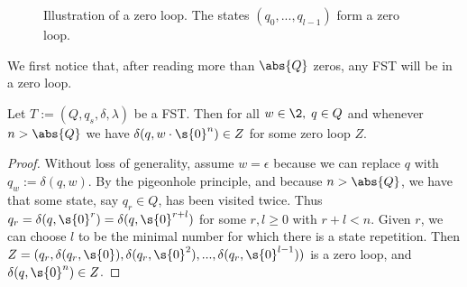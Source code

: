 \begin{figure}[H]
	\centering
	\caption{Illustration of a zero loop. The states $(q_0,...,q_{l-1})$ form a zero loop. }\label{fig:zero_loop}
\end{figure}

We first notice that, after reading more than $\abs{Q}$ zeros, any FST will be in a zero loop. 

\begin{proposition}\label{exists_zero_loop}
	Let $T:=(Q,q_s,\delta,\lambda)$ be a FST. Then for all $w\in\2,\;q\in Q$ and whenever $n > \abs{Q}$ we have
	$\delta(q,w\cdot \s{0}^{n})\in Z$ for some zero loop $Z$.
	\begin{proof}
		Without loss of generality, assume $w=\epsilon$ because we can replace $q$ with $q_w := \delta(q,w)$.
		By the pigeonhole principle, and because $n > \abs{Q}$, we have that some state, say $q_r\in Q$, has been visited twice. Thus $q_r = \delta(q,\s{0}^r) = \delta(q,\s{0}^{r+l})$ for some $r,l\geq 0$ with $r+l<n$. Given $r$, we can choose $l$ to be the minimal number for which there is a state repetition. Then $Z = (q_r,\delta(q_r,\s{0}),\delta(q_r,\s{0}^2),...,\delta(q_r,\s{0}^{l-1}))$ is a zero loop, and $\delta(q,\s{0}^{n})\in Z$.
	\end{proof}

\end{proposition}

